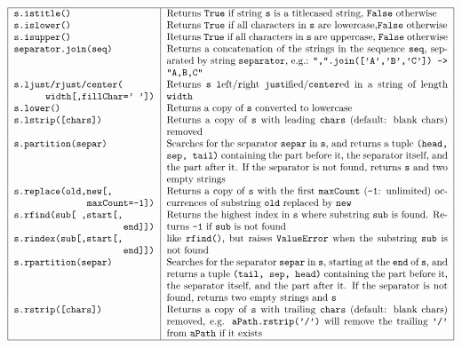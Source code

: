 $$\begin{tabular}{|p{5cm}|p{10cm}|}
\hline
\tt s.istitle() 				& Returns {\tt True} if string {\tt s} is a titlecased string, {\tt False} otherwise\\
\tt s.islower() 				& Returns {\tt True} if all characters in {\tt s} are lowercase,{\tt False} otherwise\\ 	
\tt s.isupper() 				& Returns {\tt True} if all characters in {\tt s} are uppercase, {\tt False} otherwise\\ 	
\tt separator.join(seq) 			& Returns a concatenation of the strings in the sequence {\tt seq}, separated by string {\tt separator}, 
                                 		  e.g.: {\tt ",".join(['A','B','C']) -> "A,B,C"}\\ 	
\tt s.ljust/rjust/center(\newline
\mbox{}\hfill width[,fillChar=' ']) 		& Returns {\tt s} {\tt l}eft/{\tt r}ight {\tt just}ified/{\tt center}ed in a string of length {\tt width}\\ 	
\tt s.lower() 					& Returns a copy of {\tt s} converted to lowercase\\ 	
\tt s.lstrip([chars]) 				& Returns a copy of {\tt s} with leading {\tt chars} (default: blank chars) removed\\ 	
\tt s.partition(separ) 				& Searches for the separator {\tt separ} in {\tt s}, and returns a tuple {\tt (head, sep, tail)} 
			 			  containing the part before it, the separator itself, and the part after it. 
			 			  If the separator is not found, returns {\tt s} and two empty strings\\ 	
\tt s.replace(old,new[,\newline
\mbox{}\hfill maxCount=-1]) 			& Returns a copy of {\tt s} with the first {\tt maxCount} 
						  ({\tt -1}: unlimited) occurrences of substring {\tt old} replaced by {\tt new}\\ 	
\tt s.rfind(sub[ ,start[,\newline
\mbox{}\hfill end]]) 				& Returns the highest index in {\tt s} where substring {\tt sub} is found. Returns {\tt -1} if {\tt sub} is not found\\ 	
\tt s.rindex(sub[,start[,\newline
\mbox{}\hfill end]]) 				& like {\tt rfind()}, but raises {\tt ValueError} when the substring {\tt sub} is not found\\ 	
\tt s.rpartition(separ) 			& Searches for the separator {\tt separ} in {\tt s}, starting at the {\tt end} of {\tt s}, and returns a tuple 
				 		  {\tt (tail, sep, head)} containing the part before it, the separator itself, and the part after it. 
				 		  If the separator is not found, returns two empty strings and {\tt s}\\ 	
\tt s.rstrip([chars]) 				& Returns a copy of {\tt s} with trailing {\tt chars} (default: blank chars) removed, 
			 			  e.g. {\tt aPath.rstrip('/')} will remove the trailing {\tt '/'} from {\tt aPath} if it exists\\	
\hline
\end{tabular}$$ 

